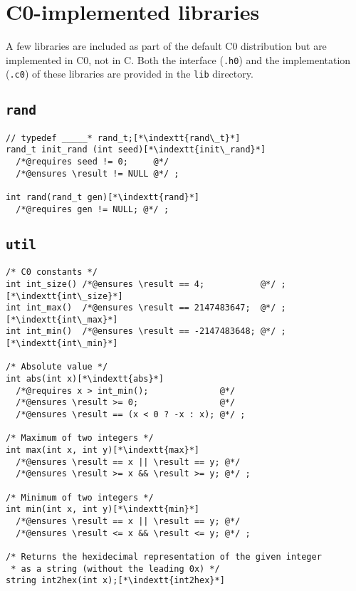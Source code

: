 \documentclass[11pt]{article}
\makeatletter
\newcommand{\indextt}[1]{\index{#1@\texttt{#1}}}
\makeatother
\begin{document}
\section{C0-implemented libraries}

A few libraries are included as part of the default C0 distribution
but are implemented in C0, not in C. Both the interface (\lstinline'.h0')
and the implementation (\lstinline'.c0') of these libraries are provided in
the \lstinline'lib' directory.

\subsection{\tt rand}

\begin{lstlisting}
// typedef _____* rand_t;[*\indextt{rand\_t}*]
rand_t init_rand (int seed)[*\indextt{init\_rand}*]
  /*@requires seed != 0;     @*/
  /*@ensures \result != NULL @*/ ;

int rand(rand_t gen)[*\indextt{rand}*]
  /*@requires gen != NULL; @*/ ;
\end{lstlisting}

\subsection{\tt util}

\begin{lstlisting}
/* C0 constants */
int int_size() /*@ensures \result == 4;           @*/ ;[*\indextt{int\_size}*]
int int_max()  /*@ensures \result == 2147483647;  @*/ ;[*\indextt{int\_max}*]
int int_min()  /*@ensures \result == -2147483648; @*/ ;[*\indextt{int\_min}*]

/* Absolute value */
int abs(int x)[*\indextt{abs}*]
  /*@requires x > int_min();              @*/
  /*@ensures \result >= 0;                @*/
  /*@ensures \result == (x < 0 ? -x : x); @*/ ;

/* Maximum of two integers */
int max(int x, int y)[*\indextt{max}*]
  /*@ensures \result == x || \result == y; @*/
  /*@ensures \result >= x && \result >= y; @*/ ;

/* Minimum of two integers */
int min(int x, int y)[*\indextt{min}*]
  /*@ensures \result == x || \result == y; @*/
  /*@ensures \result <= x && \result <= y; @*/ ;

/* Returns the hexidecimal representation of the given integer
 * as a string (without the leading 0x) */
string int2hex(int x);[*\indextt{int2hex}*]
\end{lstlisting}
\end{document}
